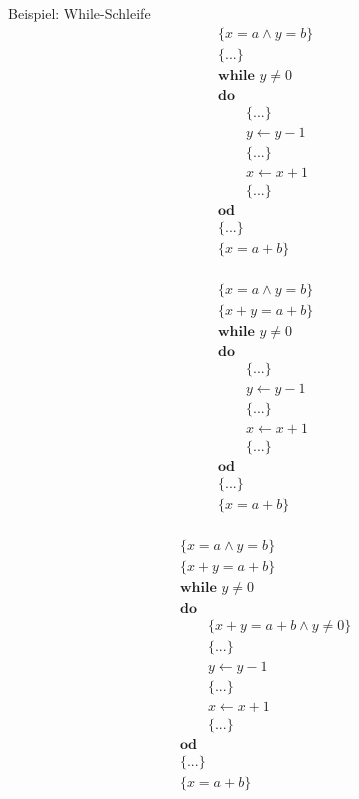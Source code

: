 \begin{frame}{Beispiel: While-Schleife}
  \begin{align*}
    &\{x=a \land y=b\}  \\
    &\{ ... \} \\
    &\textbf{while } y\not=0  \\
    &\textbf{do } \\
    &\qquad\{ ... \} \\
    &\qquad y \gets y-1 \\
    &\qquad\{ ... \} \\
    &\qquad x \gets x+1 \\
    &\qquad\{ ... \} \\
    &\textbf{od } \\
    &\{ ... \} \\
    &\{x=a+b\} \\
  \end{align*}
\end{frame}

\begin{frame}
  \begin{align*}
    &\{x=a \land y=b\}  \\
    &\{ x+y=a+b \} \\
    &\textbf{while } y\not=0  \\
    &\textbf{do } \\
    &\qquad\{ ... \} \\
    &\qquad y \gets y-1 \\
    &\qquad\{ ... \} \\
    &\qquad x \gets x+1 \\
    &\qquad\{ ... \} \\
    &\textbf{od } \\
    &\{ ... \} \\
    &\{x=a+b\} \\
  \end{align*}
\end{frame}

\begin{frame}
  \begin{align*}
    &\{x=a \land y=b\}  \\
    &\{ x+y=a+b \} \\
    &\textbf{while } y\not=0  \\
    &\textbf{do } \\
    &\qquad\{ x+y=a+b \land y\not=0 \} \\
    &\qquad\{ ... \} \\
    &\qquad y \gets y-1 \\
    &\qquad\{ ... \} \\
    &\qquad x \gets x+1 \\
    &\qquad\{ ... \} \\
    &\textbf{od } \\
    &\{ ... \} \\
    &\{x=a+b\} \\
  \end{align*}
\end{frame}

